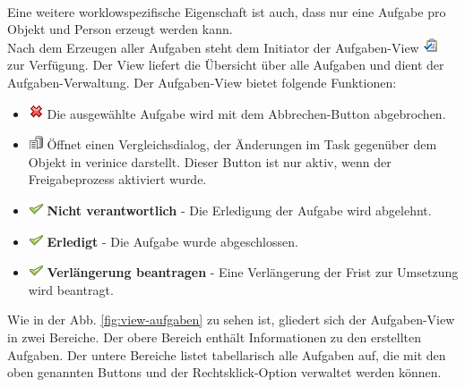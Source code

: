 \documentclass[a4paper,10pt]{book}
\begin{document}
\newline\\
Eine weitere worklowspezifische Eigenschaft ist auch, dass nur eine Aufgabe pro Objekt und Person erzeugt werden kann.
\newline\\
Nach dem Erzeugen aller Aufgaben steht dem Initiator der Aufgaben-View \includegraphics[height=2ex]{Icon/Tasks.png} zur Verfügung. Der View liefert die Übersicht über alle Aufgaben und dient der Aufgaben-Verwaltung.  Der Aufgaben-View bietet folgende Funktionen:
\begin{itemize}
\item \includegraphics[height=2ex]{Icon/Nein.png} Die ausgewählte
  Aufgabe wird mit dem Abbrechen-Button abgebrochen.
\item \includegraphics[height=2ex]{Icon/history_rep.png} Öffnet einen
  Vergleichsdialog, der Änderungen im Task gegenüber dem Objekt in
  verinice darstellt. Dieser Button ist nur aktiv, wenn der
  Freigabeprozess aktiviert wurde.
  \item \includegraphics[height=2ex]{Icon/16-em-check.png} \textbf{Nicht verantwortlich} - Die Erledigung der Aufgabe wird abgelehnt.
  \item \includegraphics[height=2ex]{Icon/16-em-check.png} \textbf{Erledigt} - Die Aufgabe wurde abgeschlossen.
  \item \includegraphics[height=2ex]{Icon/16-em-check.png} \textbf{Verlängerung beantragen} - Eine Verlängerung der Frist zur Umsetzung wird beantragt.
\end{itemize}
Wie in der Abb. \ref{fig:view-aufgaben} zu sehen ist, gliedert sich der Aufgaben-View in zwei Bereiche. Der obere Bereich enthält Informationen zu den erstellten Aufgaben. Der untere Bereiche listet tabellarisch alle Aufgaben auf, die mit den oben genannten Buttons und der Rechtsklick-Option verwaltet werden können.
\end{document}
